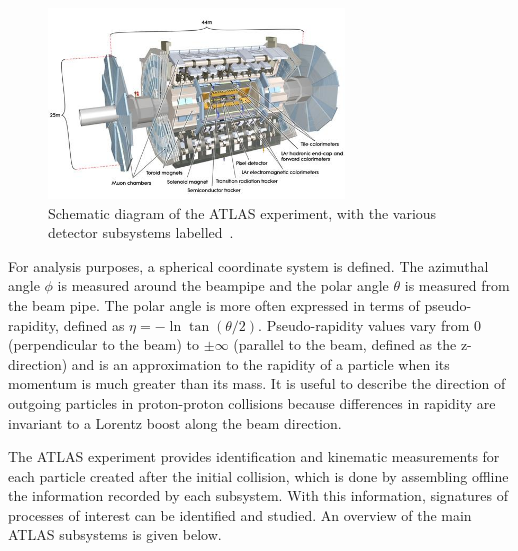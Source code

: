 \begin{figure}[h]
    \centering
    \includegraphics[width = 0.7\textwidth]{figures/atlas_diagram.png}
    \caption{Schematic diagram of the ATLAS experiment, with the various detector subsystems labelled~\cite{collaboration_atlas_2008}.}
    \label{fig:atlas}
\end{figure}

For analysis purposes, a spherical coordinate system is defined. The azimuthal angle $\phi$ is measured around the beampipe and the polar angle $\theta$ is measured from the beam pipe. The polar angle is more often expressed in terms of pseudo-rapidity, defined as $\eta = -\ln\tan\left(\theta/2\right)$.  Pseudo-rapidity values vary from 0 (perpendicular to the beam) to $\pm\infty$ (parallel to the beam, defined as the z-direction) and is an approximation to the rapidity of a particle when its momentum is much greater than its mass. It is useful to describe the direction of outgoing particles in proton-proton collisions because differences in rapidity are invariant to a Lorentz boost along the beam direction.

The ATLAS experiment provides identification and kinematic measurements for each particle created after the initial collision, which is done by assembling offline the information recorded by each subsystem. With this information, signatures of processes of interest can be identified and studied. An overview of the main ATLAS subsystems is given below.

